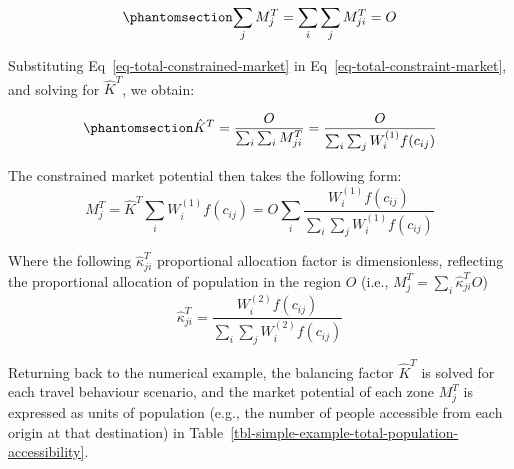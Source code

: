 \documentclass[
  10pt,
  letterpaper,
]{article}
\begin{document}
\begin{equation}\phantomsection\label{eq-total-constraint-market}{
\sum_j M^T_{j} = \sum_i\sum_j M^T_{ji} = O
}\end{equation}

Substituting Eq~\ref{eq-total-constrained-market} in
Eq~\ref{eq-total-constraint-market}, and solving for \(\hat K^T\), we
obtain:

\begin{equation}\phantomsection\label{eq-total-population-balancing-factor}{
\hat K^T=\frac{O}{\sum_i\sum_i M^T_{ji}} = \frac{O}{\sum_i\sum_j W^{(1)}_i f(c_{ij})}
}\end{equation}

The constrained market potential then takes the following form: \[
M^T_j = \hat K^T \sum_i W^{(1)}_if(c_{ij}) = O \sum_i \frac{W_i^{(1)} f(c_{ij})}{\sum_i\sum_j W^{(1)}_i f(c_{ij})}
\]

Where the following \(\hat\kappa_{ji}^T\) proportional allocation factor
is dimensionless, reflecting the proportional allocation of population
in the region \(O\) (i.e., \(M^T_j = \sum_i \hat \kappa_{ji}^T O\)) \[
\hat \kappa_{ji}^T = \frac{W^{(2)}_i  f(c_{ij})}{\sum_i\sum_j W^{(2)}_if(c_{ij})}
\]

Returning back to the numerical example, the balancing factor
\(\hat K^T\) is solved for each travel behaviour scenario, and the
market potential of each zone \(M^T_j\) is expressed as units of
population (e.g., the number of people accessible from each origin at
that destination) in
Table~\ref{tbl-simple-example-total-population-accessibility}.

\begin{table}

\caption{\label{tbl-simple-example-total-population-accessibility}Simple
system: total constrained accessible population.}


\end{table}%
\end{document}
